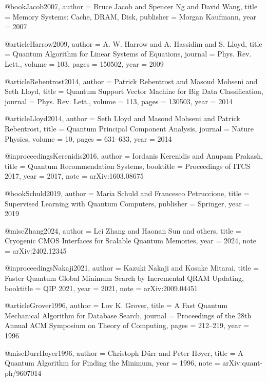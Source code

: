 \documentclass[11pt]{article}
\begin{document}
@book{Jacob2007,
  author    = {Bruce Jacob and Spencer Ng and David Wang},
  title     = {Memory Systems: Cache, DRAM, Disk},
  publisher = {Morgan Kaufmann},
  year      = {2007}
}

@article{Harrow2009,
  author  = {A. W. Harrow and A. Hassidim and S. Lloyd},
  title   = {Quantum Algorithm for Linear Systems of Equations},
  journal = {Phys. Rev. Lett.},
  volume  = {103},
  pages   = {150502},
  year    = {2009}
}

@article{Rebentrost2014,
  author  = {Patrick Rebentrost and Masoud Mohseni and Seth Lloyd},
  title   = {Quantum Support Vector Machine for Big Data Classification},
  journal = {Phys. Rev. Lett.},
  volume  = {113},
  pages   = {130503},
  year    = {2014}
}

@article{Lloyd2014,
  author  = {Seth Lloyd and Masoud Mohseni and Patrick Rebentrost},
  title   = {Quantum Principal Component Analysis},
  journal = {Nature Physics},
  volume  = {10},
  pages   = {631--633},
  year    = {2014}
}

@inproceedings{Kerenidis2016,
  author    = {Iordanis Kerenidis and Anupam Prakash},
  title     = {Quantum Recommendation Systems},
  booktitle = {Proceedings of ITCS 2017},
  year      = {2017},
  note      = {arXiv:1603.08675}
}

@book{Schuld2019,
  author    = {Maria Schuld and Francesco Petruccione},
  title     = {Supervised Learning with Quantum Computers},
  publisher = {Springer},
  year      = {2019}
}

@misc{Zhang2024,
  author = {Lei Zhang and Haonan Sun and others},
  title  = {Cryogenic CMOS Interfaces for Scalable Quantum Memories},
  year   = {2024},
  note   = {arXiv:2402.12345}
}

@inproceedings{Nakaji2021,
  author    = {Kazuki Nakaji and Kosuke Mitarai},
  title     = {Faster Quantum Global Minimum Search by Incremental QRAM Updating},
  booktitle = {QIP 2021},
  year      = {2021},
  note      = {arXiv:2009.04451}
}

@article{Grover1996,
  author  = {Lov K. Grover},
  title   = {A Fast Quantum Mechanical Algorithm for Database Search},
  journal = {Proceedings of the 28th Annual ACM Symposium on Theory of Computing},
  pages   = {212--219},
  year    = {1996}
}

@misc{DurrHoyer1996,
  author = {Christoph Dürr and Peter Høyer},
  title  = {A Quantum Algorithm for Finding the Minimum},
  year   = {1996},
  note   = {arXiv:quant-ph/9607014}
}
\end{document}

